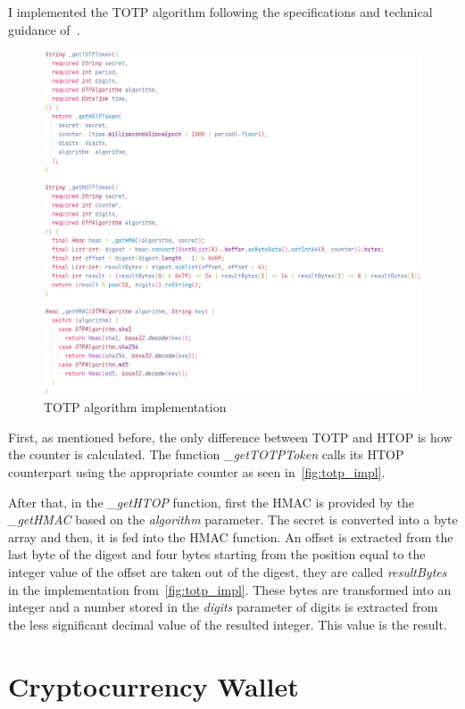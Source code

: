 \documentclass[a4paper,12pt]{report}
\begin{document}
I implemented the TOTP algorithm following the specifications and technical
guidance of~\cite{totp}.

\begin{figure}[H]
    \centering
    \includegraphics[scale=0.6]{images/code/totp.png}
    \caption{TOTP algorithm implementation}\label{fig:totp_impl}
\end{figure}

First, as mentioned before, the only difference between TOTP and HTOP is how
the counter is calculated. The function \textit{\_getTOTPToken} calls its HTOP
counterpart using the appropriate counter as seen in~\autoref{fig:totp_impl}.

After that, in the \textit{\_getHTOP} function, first the HMAC is provided by
the \textit{\_getHMAC} based on the \textit{algorithm} parameter. The secret is
converted into a byte array and then, it is fed into the HMAC function. An
offset is extracted from the last byte of the digest and four bytes starting
from the position equal to the integer value of the offset are taken out of the
digest, they are called \textit{resultBytes} in the implementation
from~\autoref{fig:totp_impl}. These bytes are transformed into an integer and a
number stored in the \textit{digits} parameter of digits is extracted from the
less significant decimal value of the resulted integer. This value is the
result.

\section{Cryptocurrency Wallet}
\end{document}
